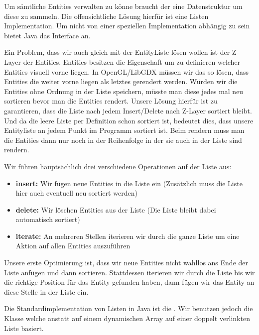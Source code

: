 Um sämtliche Entities verwalten zu könne braucht der  eine Datenstruktur um diese zu sammeln. Die offensichtliche Lösung hierfür ist eine Listen Implementation. Um nicht von einer speziellen Implementation abhängig zu sein bietet Java das  Interface an.

Ein Problem, dass wir auch gleich mit der EntityListe lösen wollen ist der Z-Layer der Entities. Entities besitzen die  Eigenschaft um zu definieren welcher Entities visuell vorne liegen. In OpenGL/LibGDX müssen wir das so lösen, dass Entities die weiter vorne liegen als letztes gerendert werden. Würden wir die Entities ohne Ordnung in der Liste speichern, müsste man diese jedes mal neu sortieren bevor man die Entities rendert. 
Unsere Lösung hierfür ist zu garantieren, dass die Liste nach jedem Insert/Delete nach Z-Layer sortiert bleibt. Und da die leere Liste per Definition schon sortiert ist, bedeutet dies, dass unsere Entityliste an jedem Punkt im Programm  sortiert ist. Beim rendern muss man die Entities dann nur noch in der Reihenfolge in der sie auch in der Liste sind rendern.

Wir führen hauptsächlich drei verschiedene Operationen auf der Liste aus:

\begin{itemize}
\item\textbf{insert:} Wir fügen neue Entities in die Liste ein (Zusätzlich muss die Liste hier auch eventuell neu sortiert werden)
\item\textbf{delete:} Wir löschen Entities aus der Liste (Die Liste bleibt dabei automatisch sortiert)
\item\textbf{iterate:} An mehreren Stellen iterieren wir durch die ganze Liste um eine Aktion auf allen Entities auszuführen
\end{itemize}

Unsere erste Optimierung ist, dass wir neue Entities nicht wahllos ans Ende der Liste anfügen und dann sortieren. Stattdessen iterieren wir durch die Liste bis wir die richtige Position für das Entity gefunden haben, dann fügen wir das Entity an diese Stelle in der Liste ein.

Die Standardimplementation von Listen in Java ist die . Wir benutzen jedoch die Klasse  welche anstatt auf einem dynamischen Array auf einer doppelt verlinkten Liste basiert.

